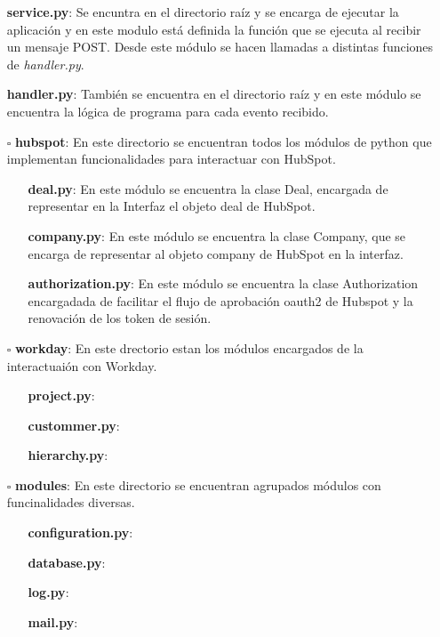 \begin{itemize}

	\item [\textendash] \textbf{service.py}: Se encuntra en el directorio raíz y se encarga de ejecutar la aplicación 
	y en este modulo está definida la función que se ejecuta al recibir un mensaje POST. Desde este módulo se hacen llamadas a distintas funciones de \textit{handler.py}.
	\item [\textendash] \textbf{handler.py}: También se encuentra en el directorio raíz y en este módulo se encuentra la lógica de programa para cada evento recibido.
	\item[$\square$] \textbf{hubspot}: En este directorio se encuentran todos los módulos de python que implementan funcionalidades para interactuar con HubSpot.
	
		\begin{itemize}
			\item [\textendash] \textbf{deal.py}: En este módulo se encuentra la clase Deal, encargada de representar en la Interfaz el objeto deal de HubSpot.
			\item [\textendash] \textbf{company.py}: En este módulo se encuentra la clase Company, que se encarga de representar al objeto company de HubSpot en la interfaz.
			\item [\textendash] \textbf{authorization.py}: En este módulo se encuentra la clase Authorization encargadada de facilitar el flujo de aprobación \gls{oauth2} de Hubspot y la renovación de los token de sesión.
		\end{itemize}
		
	\item[$\square$] \textbf{workday}: En este drectorio estan los módulos encargados de la interactuaión con Workday.
	
		\begin{itemize}
			\item [\textendash] \textbf{project.py}:
			\item [\textendash] \textbf{custommer.py}:
			\item [\textendash] \textbf{hierarchy.py}: 
		\end{itemize}
	\item[$\square$] \textbf{modules}: En este directorio se encuentran agrupados módulos con funcinalidades diversas. 
	
			\begin{itemize}
				\item [\textendash] \textbf{configuration.py}: 
				\item [\textendash] \textbf{database.py}:
				\item [\textendash] \textbf{log.py}:
				\item [\textendash] \textbf{mail.py}:
			\end{itemize}
			

\end{itemize}
